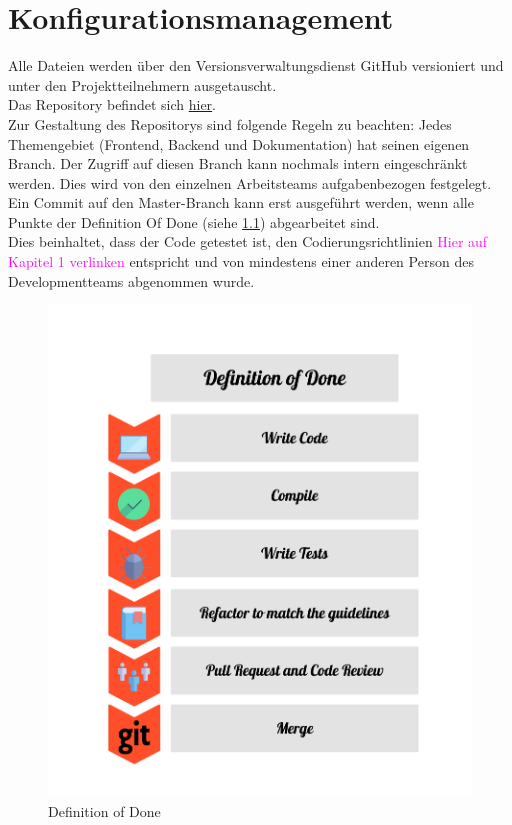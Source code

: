 
\chapter{Konfigurationsmanagement}
Alle Dateien werden über den Versionsverwaltungsdienst GitHub versioniert und unter den Projektteilnehmern ausgetauscht.\\
Das Repository befindet sich \href{https://github.com/LucRome/SWE_Semester4}{hier}.\\

Zur Gestaltung des Repositorys sind folgende Regeln zu beachten:
Jedes Themengebiet (Frontend, Backend und Dokumentation) hat seinen eigenen Branch.
Der Zugriff auf diesen Branch kann nochmals intern eingeschränkt werden. Dies wird von den einzelnen Arbeitsteams aufgabenbezogen festgelegt. \\
Ein Commit auf den Master-Branch kann erst ausgeführt werden, wenn alle Punkte der Definition Of Done (siehe \ref{fib:DOD}) abgearbeitet sind. \\
Dies beinhaltet, dass der Code getestet ist, den Codierungsrichtlinien \textcolor{magenta}{Hier auf Kapitel 1 verlinken} entspricht und von mindestens einer anderen Person des Developmentteams abgenommen wurde. \\

\begin{figure}[H]
\centering
\includegraphics[height=.8\textwidth]{definition_of_done.png}
\caption{Definition of Done}
\label{fib:DOD}
\end{figure}


